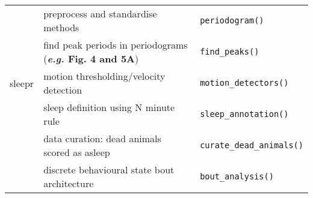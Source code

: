 \documentclass{standalone}
\begin{document}
\begin{tabular}{|l|l|l|}
	\multicolumn{ 1}{|l|}{} & preprocess and standardise methods & \texttt{periodogram()} \\ \cline{ 2- 3}
	\multicolumn{ 1}{|l|}{} & find peak periods in periodograms (\textbf{\emph{e.g.} Fig. 4 and 5A}) & \texttt{find\_peaks()} \\ \hline
	\multicolumn{ 1}{|c|}{sleepr} & motion thresholding/velocity detection & \texttt{motion\_detectors()}  \\ \cline{ 2- 3}
	\multicolumn{ 1}{|l|}{} & sleep definition using N minute rule & \texttt{sleep\_annotation()} \\ \cline{ 2- 3}
	\multicolumn{ 1}{|l|}{} & data curation: dead animals scored as asleep & \texttt{curate\_dead\_animals()} \\ \cline{ 2- 3}
	\multicolumn{ 1}{|l|}{} & discrete behavioural state bout architecture & \texttt{bout\_analysis()} \\ \hline
\end{tabular}
\end{document}
